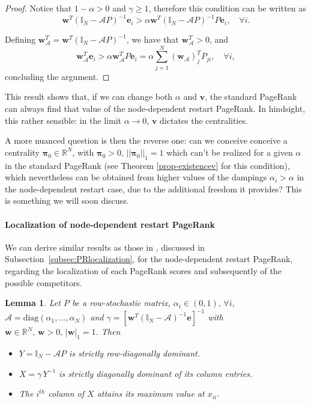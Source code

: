 \documentclass[sn-mathphys-ay]{sn-jnl}%
\newcommand{\R}{\mathbb{R}}
\newcommand{\I}{\mathbb{I}}
\newcommand{\bv}{\bm{v}}
\newcommand{\bw}{\bm{w}}
\newcommand{\be}{\mathbf{e}}
\newcommand{\cA}{\mathcal{A}}
\theoremstyle{thmstyleone}%
\theoremstyle{thmstyletwo}%
\newtheorem{lemma}[theorem]{Lemma}
\theoremstyle{thmstylethree}%
\begin{document}
\begin{proof}
	Notice that $1-\alpha>0$ and $\gamma \geq 1$, therefore this condition can be written as
	\begin{equation}
		\bw^T(\I_N -\cA P)^{-1} \be_i > \alpha \bw^T(\I_N -\cA P)^{-1} P \be_i,\quad \forall i.
	\end{equation}
	
	Defining $\bw_\cA^T=\bw^T(\I_N-\cA P)^{-1}$, we have that $\bw_\cA^T>0$, and
	\begin{equation}
		\bw_\cA^T \be_i > \alpha \bw_\cA^T P \be_i = \alpha \sum_{j=1}^N (\bw_\cA)^T_j P_{ji},\quad \forall i,
	\end{equation}
	concluding the argument.
\end{proof}

This result shows that, if we can change both $\alpha$ and $\bv$, the standard PageRank can always find that value of the node-dependent restart PageRank. In hindsight, this rather sensible: in the limit $\alpha\rightarrow 0$, $\bv$ dictates the centralities. 

A more nuanced question is then the reverse one: can we conceive conceive a centrality $\bm{\pi}_0\in\R^N$, with $\bm{\pi}_0>0,\,||\bm{\pi}_0||_1=1$ which can't be realized for a given $\alpha$ in the standard PageRank (see Theorem \ref{prop-existencev} for this condition), which nevertheless can be obtained from higher values of the dampings $\alpha_i > \alpha$ in the node-dependent restart case, due to the additional freedom it provides? This is something we will soon discuss.




\paragraph{Localization of node-dependent restart PageRank}


We can derive similar results as those in \cite{garcia2012localization}, discussed in Subsection~\ref{subsec:PRlocalization}, for the node-dependent restart PageRank, regarding the localization of each PageRank scores and subsequently of the possible competitors. 

\begin{lemma}\label{lem:diagonaldom-NPR}
	Let $P$ be a row-stochastic matrix, $\alpha_i\in(0,1),\,\forall i$, $\cA=\textrm{diag}(\alpha_1,...,\alpha_N)$ and $\gamma = [\bw^T(\I_N -\cA)^{-1}\be]^{-1}$ with $\bw\in \mathbb{R}^{N},\, \bw>0,\, |\bw|_1=1$. Then
	\begin{itemize}
		\item $Y=\I_N -\cA P$ is strictly row-diagonally dominant.
		\item $X=\gamma\, Y^{-1}$ is strictly diagonally dominant of its column entries.
		\item The $i^{th}$ column of $X$ attains its maximum value at $x_{ii}$.
	\end{itemize}
\end{lemma}
\end{document}
